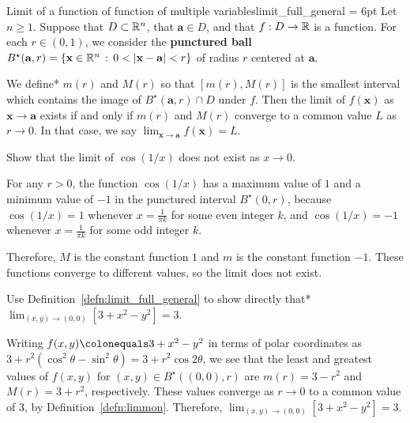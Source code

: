 \documentclass{watsonbook}
\begin{document}
\begin{defn}{Limit of a function of function of multiple
    variables}{limit_full_general} \parskip = 6pt Let $n \geq 1$. Suppose that
  $D \subset \mathbb{R}^n$, that $\mathbf{a} \in D$, and that $f:D \to
  \mathbb{R}$ is a function. For each $r \in (0,1)$, we consider the \textbf{punctured ball}
  $B^\star(\mathbf{a},r) = \{\mathbf{x} \in \mathbb{R}^n \,: \, 0 <
  \left|\mathbf{x} - \mathbf{a}\right| < r \}$ of radius $r$ centered
  at $\mathbf{a}$.

  We define* $m(r)$ and $M(r)$ so that $[m(r),M(r)]$ is the smallest
  interval which contains the image of $B^\star(\mathbf{a},r) \cap D$ under
  $f$. Then the limit of $f(\mathbf{x})$ as
  $\mathbf{x} \to \mathbf{a}$ exists if and only if $m(r)$ and $M(r)$
  converge to a common value $L$ as $r \to 0$. In that case, we say
  $\displaystyle{\lim_{\mathbf{x} \to \mathbf{a}} f(\mathbf{x}) = L}$. 
\end{defn}

\begin{example}{}{}
  Show that the limit of $\cos (1/x)$ does not exist as $x\to0$. 
\end{example}

\begin{solution}
  For any $r>0$, the function $\cos(1/x)$ has a maximum value of $1$
  and a minimum value of $-1$ in the punctured interval
  $B^\star(0,r)$, because $\cos(1/x) = 1$ whenever $x = \tfrac{1}{\pi
    k}$ for some even integer $k$, and $\cos(1/x) = -1$ whenever $x=
  \tfrac{1}{\pi k}$ for some odd integer $k$.
  
  Therefore, $M$ is the constant function $1$ and $m$
  is the constant function $-1$. These functions converge to different
  values, so the limit does not exist. 
\end{solution}

\begin{example}{}{}
  Use Definition~\ref{defn:limit_full_general} to show directly that*
  $\displaystyle{\lim_{(x,y) \to (0,0)} \left[3 + x^2 - y^2\right] =
    3}$.
\end{example}

\begin{solution}
  Writing $f(x,y) \colonequals 3 + x^2 - y^2$ in terms of polar coordinates as
  $3 + r^2(\cos^2 \theta - \sin^2 \theta) = 3 +r^2 \cos2\theta$, we
  see that the least and greatest values of $f(x,y)$ for
  $(x,y) \in B^\star((0,0),r)$ are $m(r) = 3-r^2$ and
  $M(r) = 3 + r^2$, respectively. These values converge as $r\to 0$ to a common
  value of $3$, by Definition~\ref{defn:limmon}. Therefore,
  $\displaystyle{\lim_{(x,y) \to (0,0)} \left[3 + x^2 - y^2\right] =
    3}$. 
\end{solution}
\end{document}
